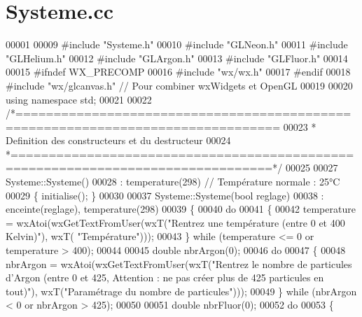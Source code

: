 \section{Systeme.\+cc}
\label{_systeme_8cc_source}

\begin{DoxyCode}
00001 
00009 \textcolor{preprocessor}{#include "Systeme.h"}
00010 \textcolor{preprocessor}{#include "GLNeon.h"}
00011 \textcolor{preprocessor}{#include "GLHelium.h"}
00012 \textcolor{preprocessor}{#include "GLArgon.h"}
00013 \textcolor{preprocessor}{#include "GLFluor.h"}
00014 
00015 \textcolor{preprocessor}{#ifndef WX\_PRECOMP}
00016 \textcolor{preprocessor}{#include "wx/wx.h"}
00017 \textcolor{preprocessor}{#endif}
00018 \textcolor{preprocessor}{#include "wx/glcanvas.h"} \textcolor{comment}{// Pour combiner wxWidgets et OpenGL}
00019 
00020 \textcolor{keyword}{using namespace }std;
00021 
00022 \textcolor{comment}{/*================================================================================}
00023 \textcolor{comment}{ * Definition des constructeurs et du destructeur}
00024 \textcolor{comment}{ *================================================================================*/}
00025 
00027 Systeme::Systeme()
00028  : temperature(298) \textcolor{comment}{// Température normale : 25°C}
00029 \{ initialise(); \}
00030 
00037 Systeme::Systeme(\textcolor{keywordtype}{bool} reglage)
00038  : enceinte(reglage), temperature(298)
00039 \{
00040     \textcolor{keywordflow}{do}
00041     \{
00042         temperature = wxAtoi(wxGetTextFromUser(wxT(\textcolor{stringliteral}{"Rentrez une température (entre 0 et 400 Kelvin)"}), wxT(\textcolor{stringliteral}{
      "Température"})));
00043     \} \textcolor{keywordflow}{while} (temperature <= 0 or temperature > 400);
00044     
00045     \textcolor{keywordtype}{double} nbrArgon(0);
00046     \textcolor{keywordflow}{do}
00047     \{
00048         nbrArgon = wxAtoi(wxGetTextFromUser(wxT(\textcolor{stringliteral}{"Rentrez le nombre de particules d'Argon (entre 0 et 425,
       Attention : ne pas créer plus de 425 particules en tout)"}), wxT(\textcolor{stringliteral}{"Paramétrage du nombre de particules"})));
00049     \} \textcolor{keywordflow}{while} (nbrArgon < 0 or nbrArgon > 425);
00050     
00051     \textcolor{keywordtype}{double} nbrFluor(0);
00052     \textcolor{keywordflow}{do}
00053     \{

\end{DoxyCode}
